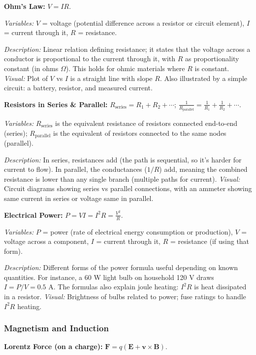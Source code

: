 \documentclass{article}
\begin{document}
\textbf{Ohm’s Law:} $V = I R$.

\textit{Variables:} $V$ = voltage (potential difference across a resistor or circuit element), $I$ = current through it, $R$ = resistance.

\textit{Description:} Linear relation defining resistance; it states that the voltage across a conductor is proportional to the current through it, with $R$ as proportionality constant (in ohms $\Omega$). This holds for ohmic materials where $R$ is constant. \textit{Visual:} Plot of $V$ vs $I$ is a straight line with slope $R$. Also illustrated by a simple circuit: a battery, resistor, and measured current.

\textbf{Resistors in Series \& Parallel:} $R_{\text{series}} = R_1+R_2+\cdots$;  $\displaystyle \frac{1}{R_{\text{parallel}}} = \frac{1}{R_1} + \frac{1}{R_2} + \cdots$.

\textit{Variables:} $R_{\text{series}}$ is the equivalent resistance of resistors connected end-to-end (series); $R_{\text{parallel}}$ is the equivalent of resistors connected to the same nodes (parallel).

\textit{Description:} In series, resistances add (the path is sequential, so it’s harder for current to flow). In parallel, the conductances ($1/R$) add, meaning the combined resistance is lower than any single branch (multiple paths for current). \textit{Visual:} Circuit diagrams showing series vs parallel connections, with an ammeter showing same current in series or voltage same in parallel.

\textbf{Electrical Power:} $P = V I = I^2 R = \frac{V^2}{R}$.

\textit{Variables:} $P$ = power (rate of electrical energy consumption or production), $V$ = voltage across a component, $I$ = current through it, $R$ = resistance (if using that form).

\textit{Description:} Different forms of the power formula useful depending on known quantities. For instance, a 60 W light bulb on household 120 V draws $I = P/V = 0.5$ A. The formulas also explain joule heating: $I^2R$ is heat dissipated in a resistor. \textit{Visual:} Brightness of bulbs related to power; fuse ratings to handle $I^2R$ heating.

\subsubsection*{Magnetism and Induction}

\textbf{Lorentz Force (on a charge):} $\mathbf{F} = q(\mathbf{E} + \mathbf{v} \times \mathbf{B})$.
\end{document}
